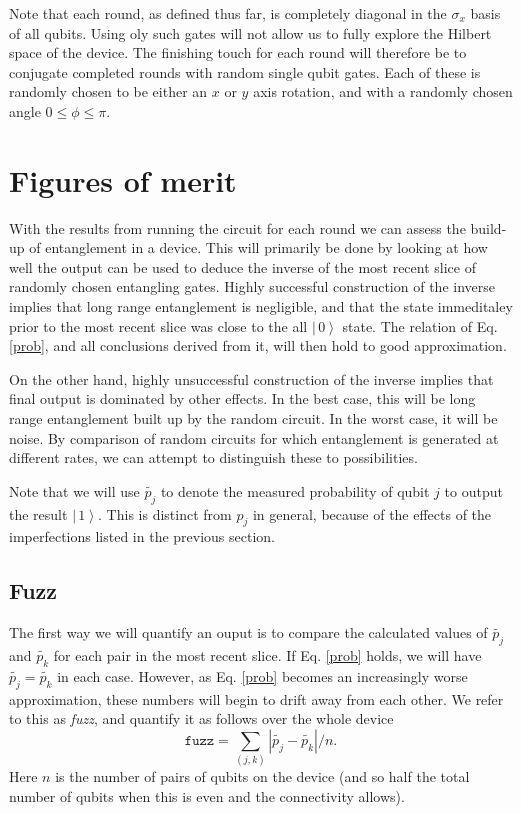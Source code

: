 \documentclass[aps,prl,twocolumn,showpacs,preprintnumbers]{revtex4-1}
\newcommand{\be}{\begin{equation}}
\newcommand{\ee}{\end{equation}}
\newcommand{\ket}[1]{\left | \, #1 \right\rangle}
\begin{document}
Note that each round, as defined thus far, is completely diagonal in the $\sigma_x$ basis of all qubits. Using oly such gates will not allow us to fully explore the Hilbert space of the device. The finishing touch for each round will therefore be to conjugate completed rounds with random single qubit gates. Each of these is randomly chosen to be either an $x$ or $y$ axis rotation, and with a randomly chosen angle $0\leq\phi\leq\pi$.


\section{Figures of merit}

With the results from running the circuit for each round we can assess the build-up of entanglement in a device. This will primarily be done by looking at how well the output can be used to deduce the inverse of the most recent slice of randomly chosen entangling gates. Highly successful construction of the inverse implies that long range entanglement is negligible, and that the state immeditaley prior to the most recent slice was close to the all $\ket{0}$ state. The relation of Eq. \ref{prob}, and all conclusions derived from it, will then hold to good approximation.

On the other hand, highly unsuccessful construction of the inverse implies that final output is dominated by other effects. In the best case, this will be long range entanglement built up by the random circuit. In the worst case, it will be noise. By comparison of random circuits for which entanglement is generated at different rates, we can attempt to distinguish these to possibilities.

Note that we will use $\tilde{p_j}$ to denote the measured probability of qubit $j$ to output the result $\ket{1}$. This is distinct from $p_j$ in general, because of the effects of the imperfections listed in the previous section.

\subsection{Fuzz}

The first way we will quantify an ouput is to compare the calculated values of $\tilde{p_j}$ and $\tilde{p_k}$ for each pair in the most recent slice. If Eq. \ref{prob} holds, we will have $\tilde{p_j}=\tilde{p_k}$ in each case. However, as Eq. \ref{prob} becomes an increasingly worse approximation, these numbers will begin to drift away from each other. We refer to this as \textit{fuzz}, and quantify it as follows over the whole device
\be
\mathtt{fuzz} = \sum_{(j,k)} | \tilde{p_j} - \tilde{p_k} | / n.
\ee
Here $n$ is the number of pairs of qubits on the device (and so half the total number of qubits when this is even and the connectivity allows).
\end{document}
